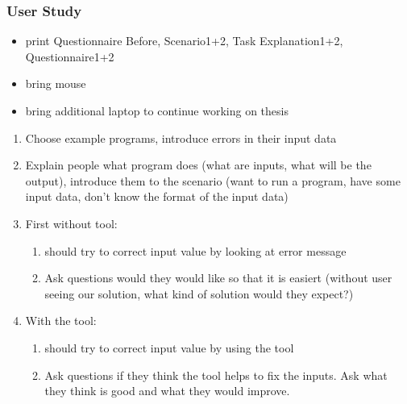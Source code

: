 \documentclass[11pt]{article}
\begin{document}
\subsubsection{User Study}

\begin{itemize}
    \item print Questionnaire Before, Scenario1+2, Task Explanation1+2, Questionnaire1+2
    \item bring mouse
    \item bring additional laptop to continue working on thesis
\end{itemize}


\begin{enumerate}
    \item Choose example programs, introduce errors in their input data
    \item Explain people what program does (what are inputs, what will be the output), introduce them to the scenario (want to run a program, have some input data, don't know the format of the input data)
    \item First without tool:
    \begin{enumerate}
        \item should try to correct input value by looking at error message
        \item Ask questions would they would like so that it is easiert (without user seeing our solution, what kind of solution would they expect?)
    \end{enumerate}
    \item With the tool:
    \begin{enumerate}
        \item should try to correct input value by using the tool
        \item Ask questions if they think the tool helps to fix the inputs. Ask what they think is good and what they would improve.
    \end{enumerate}
\end{enumerate}
\end{document}
